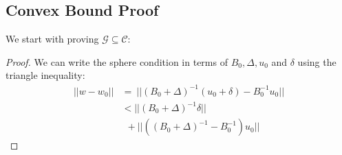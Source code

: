 \documentclass[11pt,twocolumn,varwidth=true,a4paper,fleqn]{article}
\begin{document}
\subsection{Convex Bound Proof}
We start with proving $\mathcal{G} \subseteq \mathcal{C}$:
\begin{proof}
We can write the sphere condition in terms of $B_0, \Delta, u_0$ and $\delta$ using the triangle
inequality:
\begin{equation} \label{in}
\begin{split}
||w-w_0|| & = \ ||(B_0+\Delta)^{-1}(u_0+\delta) - B_0^{-1}u_0|| \\
& < ||(B_0+\Delta)^{-1}\delta|| \\
& \ \ + ||((B_0+\Delta)^{-1} - B_0^{-1})u_0||
\end{split}
\end{equation}


\end{proof}
\end{document}
